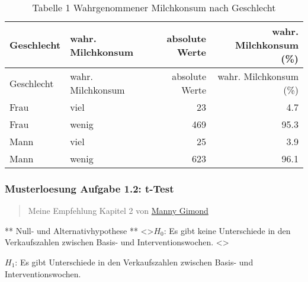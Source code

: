 \documentclass[]{article}
\newenvironment{Shaded}{\begin{snugshade}}{\end{snugshade}}
\newcommand{\CharTok}[1]{\textcolor[rgb]{0.31,0.60,0.02}{#1}}
\newcommand{\CommentTok}[1]{\textcolor[rgb]{0.56,0.35,0.01}{\textit{#1}}}
\newcommand{\DataTypeTok}[1]{\textcolor[rgb]{0.13,0.29,0.53}{#1}}
\newcommand{\DecValTok}[1]{\textcolor[rgb]{0.00,0.00,0.81}{#1}}
\newcommand{\KeywordTok}[1]{\textcolor[rgb]{0.13,0.29,0.53}{\textbf{#1}}}
\newcommand{\NormalTok}[1]{#1}
\newcommand{\OperatorTok}[1]{\textcolor[rgb]{0.81,0.36,0.00}{\textbf{#1}}}
\newcommand{\StringTok}[1]{\textcolor[rgb]{0.31,0.60,0.02}{#1}}
\begin{document}
\begin{longtable}[]{@{}llrr@{}}
\caption{Tabelle 1 Wahrgenommener Milchkonsum nach
Geschlecht}\tabularnewline
\toprule
Geschlecht & wahr. Milchkonsum & absolute Werte & wahr. Milchkonsum
(\%)\tabularnewline
\midrule
\endfirsthead
\toprule
Geschlecht & wahr. Milchkonsum & absolute Werte & wahr. Milchkonsum
(\%)\tabularnewline
\midrule
\endhead
Frau & viel & 23 & 4.7\tabularnewline
Frau & wenig & 469 & 95.3\tabularnewline
Mann & viel & 25 & 3.9\tabularnewline
Mann & wenig & 623 & 96.1\tabularnewline
\bottomrule
\end{longtable}

\hypertarget{musterloesung-aufgabe-1.2-t-test}{%
\subsubsection{Musterloesung Aufgabe 1.2:
t-Test}\label{musterloesung-aufgabe-1.2-t-test}}

\begin{quote}
Meine Empfehlung Kapitel 2 von
\href{https://mgimond.github.io/Stats-in-R/z_t_tests.html}{Manny Gimond}
\end{quote}

** Null- und Alternativhypothese ** \textless\textgreater{}\(H_0\): Es
gibt keine Unterschiede in den Verkaufszahlen zwischen Basis- und
Interventionswochen. \textless\textgreater{}

\par

\(H_1\): Es gibt Unterschiede in den Verkaufszahlen zwischen Basis- und
Interventionswochen.

\begin{Shaded}
\end{Shaded}
\end{document}

